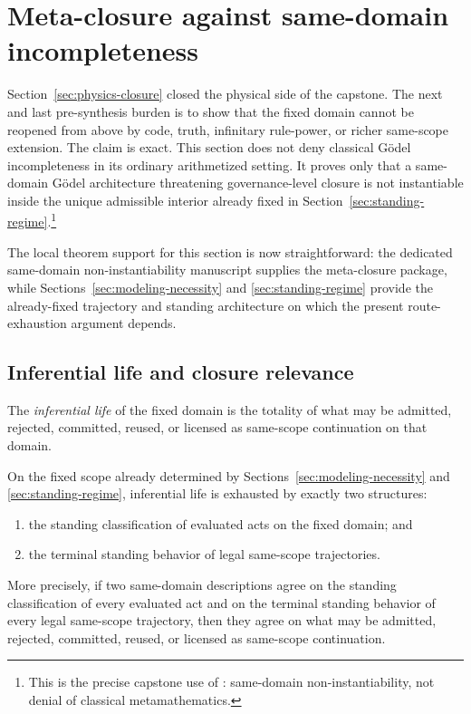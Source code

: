 \section{Meta-closure against same-domain incompleteness}
\label{sec:meta-closure}

Section~\ref{sec:physics-closure} closed the physical side of the capstone. The next and last pre-synthesis burden is to show that the fixed domain cannot be reopened from above by code, truth, infinitary rule-power, or richer same-scope extension. The claim is exact. This section does not deny classical G\"odel incompleteness in its ordinary arithmetized setting. It proves only that a same-domain G\"odel architecture threatening governance-level closure is not instantiable inside the unique admissible interior already fixed in Section~\ref{sec:standing-regime}.\footnote{This is the precise capstone use of \noninstgodeldoc{} \cite{MaleyNonInst}: same-domain non-instantiability, not denial of classical metamathematics.}

The local theorem support for this section is now straightforward: the dedicated same-domain non-instantiability manuscript supplies the meta-closure package, while Sections~\ref{sec:modeling-necessity} and \ref{sec:standing-regime} provide the already-fixed trajectory and standing architecture on which the present route-exhaustion argument depends.\cite{MaleyNonInst}

\subsection{Inferential life and closure relevance}

\begin{definition}
The \emph{inferential life} of the fixed domain is the totality of what may be admitted, rejected, committed, reused, or licensed as same-scope continuation on that domain.
\end{definition}

\begin{theorem}
\label{thm:inferential-life-exhaustion}
On the fixed scope already determined by Sections~\ref{sec:modeling-necessity} and \ref{sec:standing-regime}, inferential life is exhausted by exactly two structures:
\begin{enumerate}
  \item the standing classification of evaluated acts on the fixed domain; and
  \item the terminal standing behavior of legal same-scope trajectories.
\end{enumerate}
More precisely, if two same-domain descriptions agree on the standing classification of every evaluated act and on the terminal standing behavior of every legal same-scope trajectory, then they agree on what may be admitted, rejected, committed, reused, or licensed as same-scope continuation.
\end{theorem}

